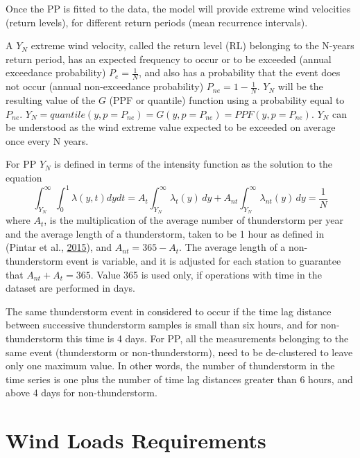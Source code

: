 \documentclass[12pt,oneside]{reedthesis}
\begin{document}
Once the PP is fitted to the data, the model will provide extreme wind velocities (return levels), for different return periods (mean recurrence intervals).

A \(Y_N\) extreme wind velocity, called the return level (RL) belonging to the N-years return period, has an expected frequency to occur or to be exceeded (annual exceedance probability) \(P_e = \frac{1}{N}\), and also has a probability that the event does not occur (annual non-exceedance probability) \(P_{ne}=1-\frac{1}{N}\). \(Y_N\) will be the resulting value of the \(G\) (PPF or quantile) function using a probability equal to \(P_{ne}\). \(Y_N=quantile(y, p=P_{ne})=G(y,p=P_{ne})=PPF(y,p=P_{ne})\). \(Y_N\) can be understood as the wind extreme value expected to be exceeded on average once every N years.

For PP \(Y_N\) is defined in terms of the intensity function as the solution to the equation
\begin{equation}
          \int_{Y_N}^{\infty}\int_0^1\lambda\left( y,t\right)dydt = A_t\int_{Y_N}^{\infty}\lambda_t\left( y\right)\,dy + A_{nt}\int_{Y_N}^{\infty}\lambda_{nt}\left( y\right)\,dy = \frac{1}{N}
  \label{eq:pprl}
\end{equation}
where \(A_t\), is the multiplication of the average number of thunderstorm per year and the average length of a thunderstorm, taken to be 1 hour as defined in (Pintar et al., \protect\hyperlink{ref-Pintar2015}{2015}), and \(A_{nt} = 365 - A_t\). The average length of a non-thunderstorm event is variable, and it is adjusted for each station to guarantee that \(A_{nt} + A_t = 365\). Value 365 is used only, if operations with time in the dataset are performed in days.

The same thunderstorm event in considered to occur if the time lag distance between successive thunderstorm samples is small than six hours, and for non-thunderstorm this time is 4 days. For PP, all the measurements belonging to the same event (thunderstorm or non-thunderstorm), need to be de-clustered to leave only one maximum value. In other words, the number of thunderstorm in the time series is one plus the number of time lag distances greater than 6 hours, and above 4 days for non-thunderstorm.

\hypertarget{windloadsrequirements}{%
\section{Wind Loads Requirements}\label{windloadsrequirements}}
\end{document}
